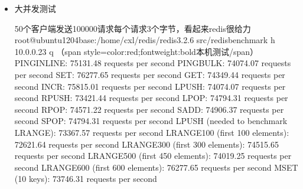 \documentclass[a4paper,10pt,english]{sphinxmanual}
\begin{document}
\begin{itemize}
\begin{itemize}
\begin{sphinxVerbatim}[commandchars=\\\{\}]
10.0.0.23:6379\PYGZgt{} flushall //清空redis
10.0.0.23:6379\PYGZgt{} info
\PYGZsh{} Memory
used\PYGZus{}memory:821552
used\PYGZus{}memory\PYGZus{}human:803.70K
看出来，redis初始状态就占用803.70k，所以设置1m最大内存，实际可用应该是200k左右
运行脚本插入1000个键值

\PYGZgt{}方式1
./addkey.sh \textbar{} nc 10.0.0.23 6379

\PYGZgt{}方式2
./addkey.sh \textbar{} ../redis\PYGZhy{}3.2.6/src/redis\PYGZhy{}cli \PYGZhy{}h 10.0.0.23 \PYGZhy{}a prettydogKnockTheDoor \PYGZhy{}\PYGZhy{}pipe
All data transferred. Waiting for the last reply...
Last reply received from server.
errors: 0, replies: 100001


10.0.0.23:6379\PYGZgt{} info
\PYGZsh{} Memory
used\PYGZus{}memory:871184
used\PYGZus{}memory\PYGZus{}human:850.77K

占用内存47k，所以11字节的key+value大概占用47字节的内存空间
修改一下脚本加入4000key
\PYGZhy{}OOM command not allowed when used memory \PYGZgt{} \PYGZsq{}maxmemory\PYGZsq{}.
10.0.0.23:6379\PYGZgt{} dbsize
(integer) 3109
只加入了3109键值
used\PYGZus{}memory:980120
used\PYGZus{}memory\PYGZus{}human:957.15K
\end{sphinxVerbatim}

\item {} 
大并发测试

\begin{sphinxVerbatim}[commandchars=\\\{\}]
50个客户端发送100000请求每个请求3个字节，看起来redis很给力
root@ubuntu1204base:/home/cxl/redis/redis\PYGZhy{}3.2.6\PYGZsh{} src/redis\PYGZhy{}benchmark \PYGZhy{}h 10.0.0.23 \PYGZhy{}q （\PYGZlt{}span style=\PYGZsq{}color:red;font\PYGZhy{}weight:bold\PYGZsq{}\PYGZgt{}本机测试\PYGZlt{}/span\PYGZgt{}）
PING\PYGZus{}INLINE: 75131.48 requests per second
PING\PYGZus{}BULK: 74074.07 requests per second
SET: 76277.65 requests per second
GET: 74349.44 requests per second
INCR: 75815.01 requests per second
LPUSH: 74074.07 requests per second
RPUSH: 73421.44 requests per second
LPOP: 74794.31 requests per second
RPOP: 74571.22 requests per second
SADD: 74906.37 requests per second
SPOP: 74794.31 requests per second
LPUSH (needed to benchmark LRANGE): 73367.57 requests per second
LRANGE\PYGZus{}100 (first 100 elements): 72621.64 requests per second
LRANGE\PYGZus{}300 (first 300 elements): 74515.65 requests per second
LRANGE\PYGZus{}500 (first 450 elements): 74019.25 requests per second
LRANGE\PYGZus{}600 (first 600 elements): 76277.65 requests per second
MSET (10 keys): 73746.31 requests per second


\end{sphinxVerbatim}
\end{itemize}
\end{itemize}
\end{document}
